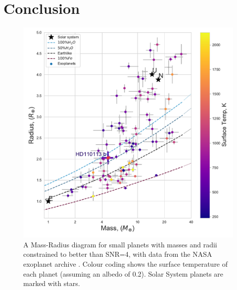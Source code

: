 \documentclass[fleqn,usenatbib]{mnras}
\newcommand{\tess}{{\it TESS}}
\newcommand{\harps}{{HARPS}}
\begin{document}

\section{Conclusion}


\begin{figure}
	\includegraphics[width=\columnwidth]{MR_Diagram_sm}
    \caption{A Mass-Radius diagram for small planets with masses and radii constrained to better than SNR=4, with data from the NASA exoplanet archive \citep{akeson2013nasa}. Colour coding shows the surface temperature of each planet (assuming an albedo of 0.2). Solar System planets are marked with stars.}
    \label{fig:example_figure}
\end{figure}
\end{document}
